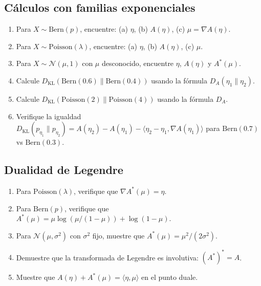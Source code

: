 \subsection*{Cálculos con familias exponenciales}
\begin{enumerate}[resume]
	\item[$\star$] Para $X \sim \mathrm{Bern}(p)$, encuentre: (a) $\eta$, (b) $A(\eta)$, (c) $\mu = \nabla A(\eta)$.
	\item[$\star$] Para $X \sim \mathrm{Poisson}(\lambda)$, encuentre: (a) $\eta$, (b) $A(\eta)$, (c) $\mu$.
	\item[$\star\star$] Para $X \sim \mathcal{N}(\mu, 1)$ con $\mu$ desconocido, encuentre $\eta$, $A(\eta)$ y $A^*(\mu)$.
	\item[$\star\star$] Calcule $D_{\mathrm{KL}}(\mathrm{Bern}(0.6) \| \mathrm{Bern}(0.4))$ usando la fórmula $D_A(\eta_1 \| \eta_2)$.
	\item[$\star\star$] Calcule $D_{\mathrm{KL}}(\mathrm{Poisson}(2) \| \mathrm{Poisson}(4))$ usando la fórmula $D_A$.
	\item[$\star\star\star$] Verifique la igualdad $D_{\mathrm{KL}}(p_{\eta_1} \| p_{\eta_2}) = A(\eta_2) - A(\eta_1) - \langle \eta_2 - \eta_1, \nabla A(\eta_1) \rangle$ para $\mathrm{Bern}(0.7)$ vs $\mathrm{Bern}(0.3)$.
\end{enumerate}

\subsection*{Dualidad de Legendre}
\begin{enumerate}[resume]
	\item[$\star\star$] Para $\mathrm{Poisson}(\lambda)$, verifique que $\nabla A^*(\mu) = \eta$.
	\item[$\star\star$] Para $\mathrm{Bern}(p)$, verifique que $A^*(\mu) = \mu\log(\mu/(1-\mu)) + \log(1-\mu)$.
	\item[$\star\star\star$] Para $\mathcal{N}(\mu, \sigma^2)$ con $\sigma^2$ fijo, muestre que $A^*(\mu) = \mu^2/(2\sigma^2)$.
	\item[$\star\star\star$] Demuestre que la transformada de Legendre es involutiva: $(A^*)^* = A$.
	\item[$\star\star\star$] Muestre que $A(\eta) + A^*(\mu) = \langle \eta, \mu \rangle$ en el punto duale.
\end{enumerate}

